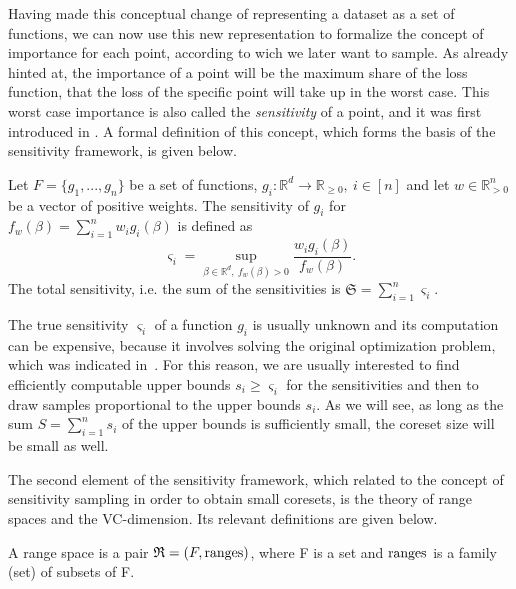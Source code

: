 Having made this conceptual change of representing a dataset as
a set of functions, we can now use this new representation to
formalize the concept of importance for each point, according
to wich we later want to sample.
As already hinted at, the importance of a point will be the
maximum share of the loss function, that the loss of the specific
point will take up in the worst case.
This worst case importance is also called the \textit{sensitivity}
of a point, and it was first introduced in
\cite{langberg-schulman-sensitivities}.
A formal definition of this concept, which forms
the basis of the sensitivity framework, is given below.

\begin{definition}
    \label{def:sensitivity}
    Let $F = \{ g_1, ..., g_n \}$ be a set of functions,
    $g_i: \mathbb{R}^d \rightarrow \mathbb{R}_{\geq 0}, \ i \in [n]$
    and let $w \in \mathbb{R}^n_{>0}$ be a vector of positive weights.
    The sensitivity of $g_i$ for $f_w(\beta) = \sum_{i=1}^n w_i g_i(\beta)$ is defined as
    \begin{equation*}
        \varsigma_i = \sup_{\beta \in \mathbb{R}^d, \ f_w(\beta) > 0} \frac{w_i g_i(\beta)}{f_w(\beta)}.
    \end{equation*}
    The total sensitivity, i.e. the sum of the sensitivities is $\mathfrak{S} = \sum_{i=1}^n \varsigma_i$.
\end{definition}

The true sensitivity $\varsigma_i$ of a function $g_i$ is usually unknown
and its computation can be expensive, because it involves solving the
original optimization problem, which was indicated in~\cite{braverman-feldman-coresets}.
For this reason, we are usually interested to find efficiently computable
upper bounds $s_i \geq \varsigma_i$ for the sensitivities and then
to draw samples proportional to the upper bounds $s_i$.
As we will see, as long as the sum $S = \sum_{i=1}^n s_i$ of the upper
bounds is sufficiently small, the coreset size will be small as well.

The second element of the sensitivity framework, which
\cite{feldman-langberg-coresets} related to the
concept of sensitivity sampling in order to obtain small coresets,
is the theory of range spaces and the VC-dimension.
Its relevant definitions are given below.

\begin{definition}
    A range space is a pair $\mathfrak{R} = (F, \textup{ranges})$, where F is a set
    and $\textup{ranges}$ is a family (set) of subsets of F.
\end{definition}

